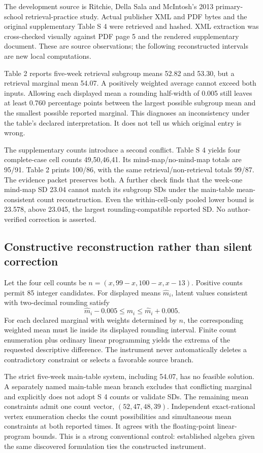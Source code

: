 The development source is Ritchie, Della Sala and McIntosh's 2013 primary-school retrieval-practice study. Actual publisher XML and PDF bytes and the original supplementary Table S 4 were retrieved and hashed. XML extraction was cross-checked visually against PDF page 5 and the rendered supplementary document. These are source observations; the following reconstructed intervals are new local computations.\citep{ritchie}

Table 2 reports five-week retrieval subgroup means 52.82 and 53.30, but a retrieval marginal mean 54.07. A positively weighted average cannot exceed both inputs. Allowing each displayed mean a rounding half-width of 0.005 still leaves at least 0.760 percentage points between the largest possible subgroup mean and the smallest possible reported marginal. This diagnoses an inconsistency under the table's declared interpretation. It does not tell us which original entry is wrong.

The supplementary counts introduce a second conflict. Table S 4 yields four complete-case cell counts 49,50,46,41. Its mind-map/no-mind-map totals are 95/91. Table 2 prints 100/86, with the same retrieval/non-retrieval totals 99/87. The evidence packet preserves both. A further check finds that the week-one mind-map SD 23.04 cannot match its subgroup SDs under the main-table mean-consistent count reconstruction. Even the within-cell-only pooled lower bound is 23.578, above 23.045, the largest rounding-compatible reported SD. No author-verified correction is asserted.

\subsection{Constructive reconstruction rather than silent correction}

Let the four cell counts be \(n=(x,99-x,100-x,x-13)\). Positive counts permit 85 integer candidates. For displayed means \(\widehat m_i\), latent values consistent with two-decimal rounding satisfy
\[
\widehat m_i-0.005\le m_i\le\widehat m_i+0.005.
\]
For each declared marginal with weights determined by \(n\), the corresponding weighted mean must lie inside its displayed rounding interval. Finite count enumeration plus ordinary linear programming yields the extrema of the requested descriptive difference. The instrument never automatically deletes a contradictory constraint or selects a favorable source branch.

The strict five-week main-table system, including 54.07, has no feasible solution. A separately named main-table mean branch excludes that conflicting marginal and explicitly does not adopt S 4 counts or validate SDs. The remaining mean constraints admit one count vector, \((52,47,48,39)\). Independent exact-rational vertex enumeration checks the count possibilities and simultaneous mean constraints at both reported times. It agrees with the floating-point linear-program bounds. This is a strong conventional control: established algebra given the same discovered formulation ties the constructed instrument.

